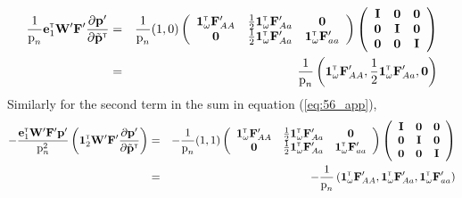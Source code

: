 \documentclass[11pt]{article}
\newcommand{\bo}[1]{{\bf #1}}
\newcommand{\tr}{{\mbox{\tiny \sf T}}}
\begin{document}
\begin{eqnarray}
	 \frac{1}{ \mbox{p}_{n}}\mathbf{e}_1^\tr \mathbf{W}^\prime \mathbf{F}^\prime   \frac{\partial  \mathbf{p}^\prime}{\partial \tilde{\bo p}^\tr} &=&  \frac{1}{ \mbox{p}_{n}} (1,0) \left(\begin{array} {ccc}
\mathbf{1}^\tr_{\omega} \mathbf{F}_{AA}^\prime& \frac{1}{2}\mathbf{1}^\tr_{\omega} \mathbf{F}_{Aa}^\prime &\mathbf{0} \\
\mathbf{0} &\frac{1}{2}\mathbf{1}^\tr_{\omega} \mathbf{F}_{Aa}^\prime & \mathbf{1}^\tr_{\omega} \mathbf{F}_{aa}^\prime
\end{array}\right) \left(\begin{array} {ccc}
\mathbf{I}&\mathbf{0}  &\mathbf{0} \\
\mathbf{0} &\mathbf{I}& \mathbf{0}  \\
\mathbf{0} &\mathbf{0}  &  \mathbf{I}
\end{array}\right) \nonumber \\
&=& \frac{1}{ \mbox{p}_{n}} \left( \mathbf{1}^\tr_{\omega} \mathbf{F}_{AA}^\prime,  \frac{1}{2}\mathbf{1}^\tr_{\omega} \mathbf{F}_{Aa}^\prime,  \mathbf{0} \right)\label{eq:first_term_app_reviewer}
\end{eqnarray}
Similarly for the second term in the sum in equation (\ref{eq:56_app}),
\begin{eqnarray}
	- \frac{\mathbf{e}_1^\tr \mathbf{W}^\prime \mathbf{F}^\prime \mathbf{p}^\prime}{ \mbox{p}_{n}^2} \left( \mathbf{1}^\tr_{2}\mathbf{W}^\prime\mathbf{F}^\prime \frac{\partial  \mathbf{p}^\prime}{\partial \tilde{\bo p}^\tr} \right) &=& -\frac{1}{ \mbox{p}_{n}}(1,1) \left(\begin{array} {ccc}
\mathbf{1}^\tr_{\omega} \mathbf{F}_{AA}^\prime& \frac{1}{2}\mathbf{1}^\tr_{\omega} \mathbf{F}_{Aa}^\prime &\mathbf{0} \\
\mathbf{0} &\frac{1}{2}\mathbf{1}^\tr_{\omega} \mathbf{F}_{Aa}^\prime & \mathbf{1}^\tr_{\omega} \mathbf{F}_{aa}^\prime
\end{array}\right)  \left(\begin{array} {ccc}
\mathbf{I}&\mathbf{0}  &\mathbf{0} \\
\mathbf{0} &\mathbf{I}& \mathbf{0}  \\
\mathbf{0} &\mathbf{0}  &  \mathbf{I}
\end{array}\right) \nonumber \\
 &=& -\frac{1}{ \mbox{p}_{n}} \left( \mathbf{1}^\tr_{\omega} \mathbf{F}_{AA}^\prime, \mathbf{1}^\tr_{\omega} \mathbf{F}_{Aa}^\prime, \mathbf{1}^\tr_{\omega} \mathbf{F}_{aa}^\prime   \right) \label{eq:second_term_app_reviewer}
\end{eqnarray}
\end{document}
